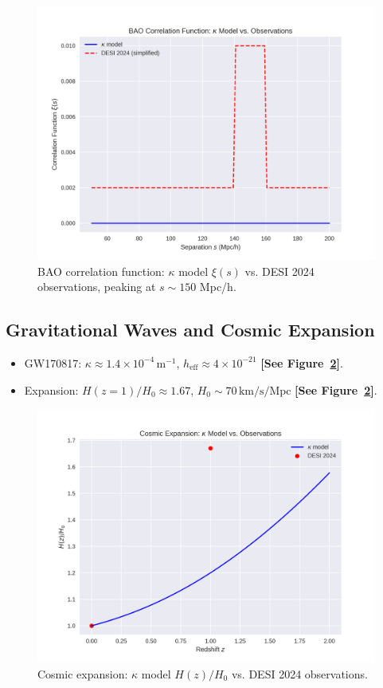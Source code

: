\documentclass[a4paper,12pt]{article}
\begin{document}
\begin{figure}[H]
    \centering
    \includegraphics[width=0.8\linewidth]{figure7.png}
    \caption{BAO correlation function: $\kappa$ model $\xi(s)$ vs. DESI 2024 observations, peaking at $s \sim 150$ Mpc/h.}
    \label{fig:7}
\end{figure}

\subsection{Gravitational Waves and Cosmic Expansion}
\begin{itemize}
    \item GW170817: $\kappa \approx 1.4 \times 10^{-4} \, \text{m}^{-1}$, $h_\text{eff} \approx 4 \times 10^{-21}$ \citep{LIGO2017} \textbf{[See Figure~\ref{fig:8}]}.
    \item Expansion: $H(z=1)/H_0 \approx 1.67$, $H_0 \sim 70 \, \text{km/s/Mpc}$ \citep{DESI2024} \textbf{[See Figure~\ref{fig:8}]}.
\end{itemize}

\begin{figure}[H]
    \centering
    \includegraphics[width=0.8\linewidth]{figure8.png}
    \caption{Cosmic expansion: $\kappa$ model $H(z)/H_0$ vs. DESI 2024 observations.}
    \label{fig:8}
\end{figure}
\end{document}
